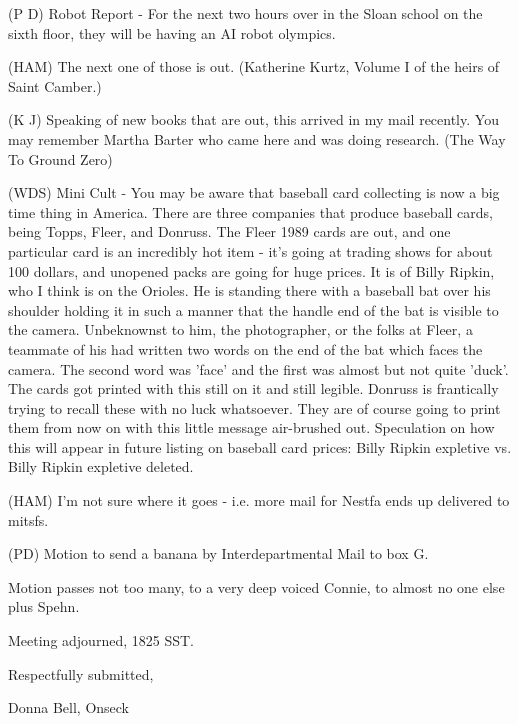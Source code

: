 \documentclass[12pt]{article}
\begin{document}
(P D) Robot Report - For the next two hours over in the Sloan school on the sixth floor, they will be having an AI robot olympics.

(HAM) The next one of those is out. (Katherine Kurtz, Volume I of the heirs of Saint Camber.)

(K J) Speaking of new books that are out, this arrived in my mail recently.  You may remember Martha Barter who came here and was doing research. (The Way To Ground Zero)

(WDS) Mini Cult - You may be aware that baseball card collecting is now a big time thing in America. There are three companies that produce baseball cards, being Topps, Fleer, and Donruss. The Fleer 1989 cards are out, and one particular card is an incredibly hot item - it's going at trading shows for about 100 dollars, and unopened packs are going for huge prices. It is of Billy Ripkin, who I think is on the Orioles. He is standing there with a baseball bat over his shoulder holding it in such a manner that the handle end of the bat is visible to the camera.  Unbeknownst to him, the photographer, or the folks at Fleer, a teammate of his had written two words on the end of the bat which faces the camera. The second word was 'face' and the first was almost but not quite 'duck'.  The cards got printed with this still on it and still legible. Donruss is frantically trying to recall these with no luck whatsoever.  They are of course going to print them from now on with this little message air-brushed out. Speculation on how this will appear in future listing on baseball card prices: Billy Ripkin expletive vs. Billy Ripkin expletive deleted.

(HAM) I'm not sure where it goes - i.e. more mail for Nestfa ends up delivered to mitsfs.

(PD) Motion to send a banana by Interdepartmental Mail to box G.

Motion passes not too many, to a very deep voiced Connie, to almost no one else plus Spehn.

\vspace{12pt}

\noindent
Meeting adjourned, 1825 SST.

\vspace{18pt}

\centerline{Respectfully submitted,}
\centerline{Donna Bell, Onseck}
\end{document}
